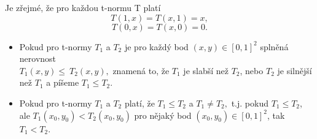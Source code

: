 \begin{graph}
\end{graph}

\begin{remark}
    Je zřejmé, že pro každou t-normu T platí
    $$T(1,x)=T(x,1)=x,$$
    $$T(0,x)=T(x,0)=0.$$
\end{remark}
\begin{definition}
\cite{KMP}
    \begin{itemize}
        \item Pokud pro t-normy $T_1$ a $T_2$ je
        pro každý bod $(x,y) \in [0,1]^2$ splněná nerovnost\\
        $T_1(x,y)\leq ~T_2(x,y),$ znamená to, že $T_1$ je slabší než $T_2$,
        nebo $T_2$ je silnější než $T_1$ a píšeme $T_1\leq T_2$.
        \item  Pokud pro t-normy $T_1$ a $T_2$ platí, že $T_1 \leq T_2$ a
        $T_1 \ne T_2,$ t.j. pokud $T_1 \leq T_2$, ale $T_1(x_0,y_0) <
        T_2(x_0,y_0)$ pro nějaký bod $(x_0,y_0) \in [0,1]^2$, tak $T_1<T_2$.
    \end{itemize}
\end{definition}


